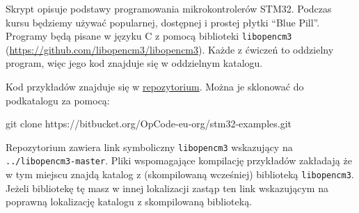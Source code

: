 % 
% 
% 
% 

Skrypt opisuje podstawy programowania mikrokontrolerów STM32. Podczas kursu będziemy używać
popularnej, dostępnej i prostej płytki ``Blue Pill''. Programy będą pisane w języku
C z pomocą biblioteki \Verb$libopencm3$ (\url{https://github.com/libopencm3/libopencm3}).
Każde z ćwiczeń to oddzielny program, więc jego kod znajduje się w oddzielnym katalogu.

Kod przykładów znajduje się w \hyperref[repo]{repozytorium}. Można je sklonować do podkatalogu za pomocą:

\begin{CodeFrame*}[bash]{}
  git clone https://bitbucket.org/OpCode-eu-org/stm32-examples.git
\end{CodeFrame*}

Repozytorium zawiera link symboliczny \Verb$libopencm3$ wskazujący na \Verb$../libopencm3-master$.
Pliki wspomagające kompilację przykładów zakładają że w tym miejscu znajdą katalog z (skompilowaną wcześniej) biblioteką \Verb$libopencm3$.
Jeżeli bibliotekę tę masz w innej lokalizacji zastąp ten link wskazującym na poprawną lokalizację katalogu z skompilowaną biblioteką.
